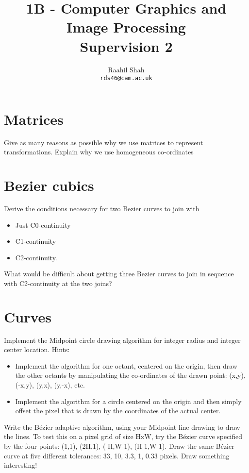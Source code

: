 \documentclass[11pt]{article}
\title{1B - Computer Graphics and Image Processing\\
Supervision 2}
\author{Raahil Shah\\
\texttt{rds46@cam.ac.uk}}
\begin{document}
\maketitle

\section{Matrices}
Give as many reasons as possible why we use matrices to represent transformations. Explain why we use homogeneous co-ordinates

\section{Bezier cubics}
Derive the conditions necessary for two Bezier curves to join with 
\begin{itemize}
	\item Just C0-continuity
	\item C1-continuity
	\item C2-continuity. 
\end{itemize}
What would be difficult about getting three Bezier curves to join in sequence with C2-continuity at the two joins?

\section{Curves}
Implement the Midpoint circle drawing algorithm for integer radius and integer center location. 
Hints: 
\begin{itemize}
	\item Implement the algorithm for one octant, centered on the origin, then draw the other octants by manipulating the co-ordinates of the drawn point: (x,y), (-x,y), (y,x), (y,-x), etc.
	\item Implement the algorithm for a circle centered on the origin and then simply offset the pixel that is drawn by the coordinates of the actual center.
\end{itemize}

Write the Bézier adaptive algorithm, using your Midpoint line drawing to draw the lines. To test this on a pixel grid of size HxW, try the Bézier curve specified by the four points: (1,1), (2H,1), (-H,W-1), (H-1,W-1). Draw the same Bézier curve at five different tolerances: 33, 10, 3.3, 1, 0.33 pixels.
Draw something interesting!
\end{document}
